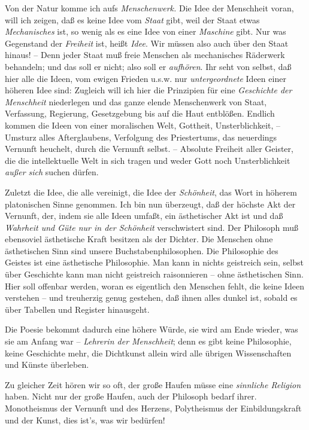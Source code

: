 \documentclass[12pt,letterpaper]{article} %
\begin{document}
Von der Natur komme ich aufs \textit{Menschenwerk.} Die Idee der Menschheit voran, will ich zeigen, daß es keine Idee vom \textit{Staat} gibt, weil der Staat etwas \textit{Mechanisches} ist, so wenig als es eine Idee von einer \textit{Maschine} gibt. Nur was Gegenstand der \textit{Freiheit} ist, heißt \textit{Idee}. Wir müssen also auch über den Staat hinaus! – Denn jeder Staat muß freie Menschen als mechanisches Räderwerk behandeln; und das soll er nicht; also soll er \textit{aufhören}. Ihr seht von selbst, daß hier alle die Ideen, vom ewigen Frieden u.s.w. nur \textit{untergeordnete} Ideen einer höheren Idee sind: Zugleich will ich hier die Prinzipien für eine \textit{Geschichte der Menschheit} niederlegen und das ganze elende Menschenwerk von Staat, Verfassung, Regierung, Gesetzgebung bis auf die Haut entblößen. Endlich kommen die Ideen von einer moralischen Welt, Gottheit, Unsterblichkeit, – Umsturz alles Afterglaubens, Verfolgung des Priestertums, das neuerdings Vernunft heuchelt, durch die Vernunft selbst. – Absolute Freiheit aller Geister, die die intellektuelle Welt in sich tragen und weder Gott noch Unsterblichkeit \textit{außer sich} suchen dürfen.

Zuletzt die Idee, die alle vereinigt, die Idee der \textit{Schönheit}, das Wort in höherem platonischen Sinne genommen. Ich bin nun überzeugt, daß der höchste Akt der Vernunft, der, indem sie alle Ideen umfaßt, ein ästhetischer Akt ist und daß \textit{Wahrheit und Güte nur in der Schönheit} verschwistert sind. Der Philosoph muß ebensoviel ästhetische Kraft besitzen als der Dichter. Die Menschen ohne ästhetischen Sinn sind unsere Buchstabenphilosophen. Die Philosophie des Geistes ist eine ästhetische Philosophie. Man kann in nichts geistreich sein, selbst über Geschichte kann man nicht geistreich raisonnieren – ohne ästhetischen Sinn. Hier soll offenbar werden, woran es eigentlich den Menschen fehlt, die keine Ideen verstehen – und treuherzig genug gestehen, daß ihnen alles dunkel ist, sobald es über Tabellen und Register hinausgeht.

Die Poesie bekommt dadurch eine höhere Würde, sie wird am Ende wieder, was sie am Anfang war – \textit{Lehrerin der Menschheit}; denn es gibt keine Philosophie, keine Geschichte mehr, die Dichtkunst allein wird alle übrigen Wissenschaften und Künste überleben.

Zu gleicher Zeit hören wir so oft, der große Haufen müsse eine \textit{sinnliche Religion} haben. Nicht nur der große Haufen, auch der Philosoph bedarf ihrer. Monotheismus der Vernunft und des Herzens, Polytheismus der Einbildungskraft und der Kunst, dies ist's, was wir bedürfen!
\end{document}
